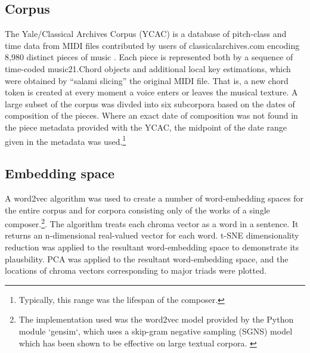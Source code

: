 \subsection{Corpus}\label{corpus}

The Yale/Classical Archives Corpus (YCAC) is a database of pitch-class
and time data from MIDI files contributed by users of
classicalarchives.com encoding 8,980 distinct pieces of music
\cite{white2014yale}. Each piece is represented both by a sequence of
time-coded music21.Chord objects and additional local key estimations, which were obtained by ``salami slicing'' the original MIDI file. That is, a new chord token is created at every moment a voice enters or leaves the musical texture.  A large subset of the corpus was divded into six subcorpora based on the dates of composition of the pieces. Where an exact date of composition was not found in the piece metadata provided with the YCAC, the midpoint of the date range given in the metadata was used.\footnote{Typically, this range was the lifespan of the composer.}

\subsection{Embedding space}\label{embedding-space}

A word2vec algorithm was used to create a number of word-embedding
spaces for the entire corpus and for corpora consisting only of the
works of a single
composer.\footnote{The implementation used was the word2vec model provided by the Python module `gensim`, which uses a skip-gram negative sampling (SGNS) model which has been shown to be effective on large textual corpora. \cite{rehurek_lrec}}.
The algorithm treats each chroma vector as a word in a sentence. It
returns an n-dimensional real-valued vector for each word. t-SNE
dimensionality reduction was applied to the resultant word-embedding
space to demonstrate its plausbility. PCA was applied to the resultant
word-embedding space, and the locations of chroma vectors corresponding
to major triads were plotted.
